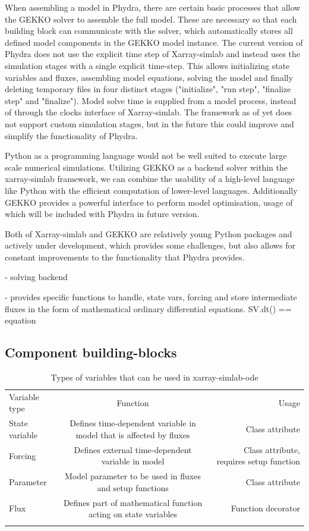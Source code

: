 \documentclass[journal abbreviation, manuscript]{copernicus}
\begin{document}
When assembling a model in Phydra, there are certain basic processes that allow the GEKKO solver to assemble the full model. These are necessary so that each building block can communicate with the solver, which automatically stores all defined model components in the GEKKO model instance. The current version of Phydra does not use the explicit time step of Xarray-simlab and instead uses the simulation stages with a single explicit time-step. This allows initializing state variables and fluxes, assembling model equations, solving the model and finally deleting temporary files in four distinct stages ("initialize", "run step", "finalize step" and "finalize"). Model solve time is supplied from a model process, instead of through the clocks interface of Xarray-simlab. The framework as of yet does not support custom simulation stages, but in the future this could improve and simplify the functionality of Phydra.

Python as a programming language would not be well suited to execute large scale numerical simulations.
Utilizing GEKKO as a backend solver within the xarray-simlab framework, we can combine the usability of a high-level language like Python with the efficient computation of lower-level languages. Additionally GEKKO provides a powerful interface to perform model optimisation, usage of which will be included with Phydra in future version. 

Both of Xarray-simlab and GEKKO are relatively young  Python packages and actively under development, which provides some challenges, but also allows for constant improvements to the functionality that Phydra provides.


- solving backend

- provides specific functions to handle, state vars, forcing and store intermediate fluxes in the form of mathematical ordinary differential equations. SV.dt() == equation


\subsection{Component building-blocks} \label{Section:ComponentBuildingBlocks}

%
\begin{table}[t]
\caption{Types of variables that can be used in xarray-simlab-ode}
\begin{tabular}{l c r}
\tophline
Variable type &  Function & Usage \\
%
\middlehline
State variable & Defines time-dependent variable in model that is affected by fluxes & Class attribute \\
Forcing & Defines external time-dependent variable in model & Class attribute, requires setup function \\
Parameter & Model parameter to be used in fluxes and setup functions & Class attribute \\
Flux & Defines part of mathematical function acting on state variables & Function decorator \\
%
\bottomhline
\end{tabular}
\belowtable{} %
\end{table}
%
\end{document}
